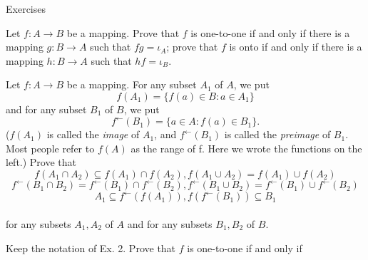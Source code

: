 \documentclass[11pt]{amsbook}
\begin{document}
   	\begin{center} 
	Exercises \\ 
	\end{center} 
    	\begin{hEnumerateArabic}
    		
    		\item  Let $f : A \rightarrow B$ be a mapping. Prove that $f$ is one-to-one if and only
		if there is a mapping $g : B \rightarrow A$ such that $fg = \iota_A $; prove that 
		$f$ is onto if and only if there is a mapping  $h : B \rightarrow A$  such that $hf = \iota_B$. \\ 
		
		\item   Let $f : A \rightarrow B$ be a mapping. For any subset $A_1$ of $A$, we put 
		$$f(A_1) = \{ f(a) \in B: a\in A_1 \}$$
		and for any subset $B_1$ of $B$, we put
		$$f^\leftarrow(B_1) = \{ a \in A: f(a)\in B_1 \}.$$
		($f(A_1)$ is called the \textit{image} of $A_1$, and $f^\leftarrow(B_1)$ is called the 
		\textit{preimage} of $B_1$. Most people refer to $f(A)$ as the range of f. Here we wrote 
		the functions on the left.) Prove that \\
		$$f(A_1 \cap A_2) \subseteq f(A_1) \cap f(A_2), f(A_1 \cup A_2) = f(A_1) \cup f(A_2)  $$
		$$f^\leftarrow(B_1 \cap B_2) =  f^\leftarrow(B_1) \cap f^\leftarrow(B_2), f^\leftarrow(B_1 \cup B_2) =  f^\leftarrow(B_1) \cup f^			                \leftarrow(B_2) $$
                $$A_1 \subseteq f^\leftarrow(f(A_1)), f(f^\leftarrow(B_1)) \subseteq B_1$$  \\
		for any subsets $A_1, A_2$  of $A$ and for any subsets $B_1, B_2$ of $B$. \\
		
		\item Keep the notation of Ex. 2. Prove that $f$ is one-to-one if and only if 
    \end{hEnumerateArabic}
\end{document}
